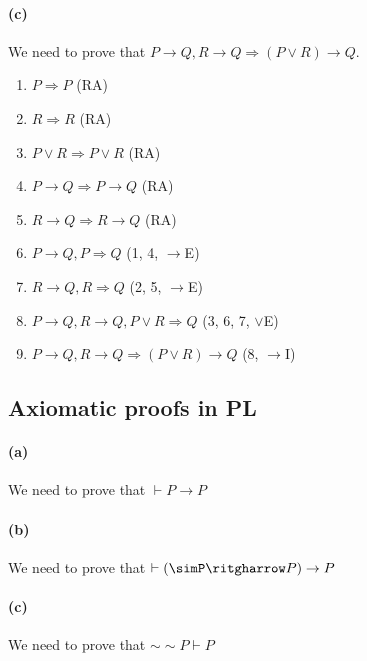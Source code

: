 \documentclass[sloppy, journal, git, bytitle]{humapap}
\begin{document}
\paragraph{(c)} We need to prove that $P\rightarrow Q, R\rightarrow Q \Rightarrow (P\vee R)\rightarrow Q$. 
\begin{enumerate}
	\item $P\Rightarrow P$ \hfil (RA)
	\item $R\Rightarrow R$ \hfil (RA)
	\item $P\vee R\Rightarrow P\vee R$ \hfil (RA)
	\item $P\rightarrow Q\Rightarrow P\rightarrow Q$ \hfil (RA)
	\item $R\rightarrow Q\Rightarrow R\rightarrow Q$ \hfil (RA)
	\item $P\rightarrow Q, P \Rightarrow Q$ \hfil (1, 4, $\rightarrow$E)
	\item $R\rightarrow Q, R \Rightarrow Q$ \hfil (2, 5, $\rightarrow$E)
	\item $P\rightarrow Q, R\rightarrow Q, P\vee R\Rightarrow Q$ \hfil (3, 6, 7, $\vee$E)
	\item $P\rightarrow Q, R\rightarrow Q\Rightarrow (P\vee R)\rightarrow Q$ \hfil (8, $\rightarrow$I)
\end{enumerate}

\subsection{Axiomatic proofs in PL}
\paragraph{(a)} We need to prove that $\vdash P\rightarrow P$
\paragraph{(b)} We need to prove that $\vdash(\simP\ritgharrow P)\rightarrow P$
\paragraph{(c)} We need to prove that $\sim\sim P\vdash P$

\standardbib
\end{document}
